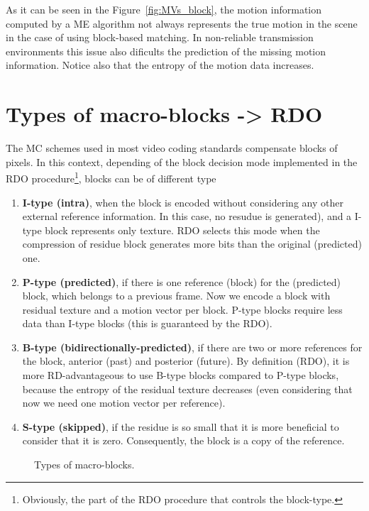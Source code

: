 As it can be seen in the Figure~\ref{fig:MVs_block}, the motion
information computed by a ME algorithm not always represents the true
motion in the scene in the case of using block-based matching. In
non-reliable transmission environments this issue also dificults the
prediction of the missing motion information. Notice also that the
entropy of the motion data increases.



\section{Types of macro-blocks -> RDO}

The MC schemes used in most video coding standards compensate blocks
of pixels. In this context, depending of the block
decision mode implemented in the RDO procedure\footnote{Obviously, the
  part of the RDO procedure that controls the block-type.}, blocks can
be of different type~\cite{vruiz__MEC}
\begin{enumerate}
\item \textbf{I-type (intra)}, when the block is encoded without
  considering any other external reference information. In this case,
  no resudue is generated), and a I-type block represents only
  texture. RDO selects this mode when the compression of residue block
  generates more bits than the original (predicted) one.
\item \textbf{P-type (predicted)}, if there is one reference (block)
  for the (predicted) block, which belongs to a previous frame. Now we
  encode a block with residual texture and a motion vector per
  block. P-type blocks require less data than I-type blocks (this is
  guaranteed by the RDO).
\item \textbf{B-type (bidirectionally-predicted)}, if there are two or
  more references for the block, anterior (past) and posterior
  (future). By definition (RDO), it is more RD-advantageous to use
  B-type blocks compared to P-type blocks, because the entropy of the
  residual texture decreases (even considering that now we need one
  motion vector per reference).
\item \textbf{S-type (skipped)}, if the residue is so small that it is
  more beneficial to consider that it is zero. Consequently, the block
  is a copy of the reference.
\end{enumerate}

\begin{figure}
  \centering
  \caption{Types of macro-blocks.}
  \label{fig:macroblocks}
\end{figure}


